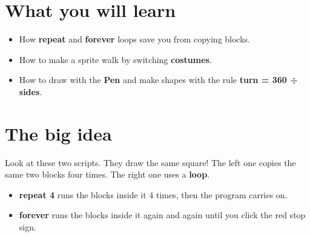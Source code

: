 
\section{What you will learn}
\begin{itemize}[leftmargin=1.2em,itemsep=1pt]
  \item How \textbf{repeat} and \textbf{forever} loops save you from copying blocks.
  \item How to make a sprite walk by switching \textbf{costumes}.
  \item How to draw with the \textbf{Pen} and make shapes with the rule \textbf{turn = 360 ÷ sides}.
\end{itemize}

\section{The big idea}
Look at these two scripts. They draw the same square! The left one copies the same two blocks four times. The right one uses a \textbf{loop}.

\begin{center}
\begin{scratch}[scale=0.75]
\end{scratch}
\hspace{1.5cm}{\Large =}\hspace{1.5cm}
\begin{scratch}[scale=0.75]
\end{scratch}
\end{center}

\begin{itemize}[leftmargin=1.2em,itemsep=1pt]
  \item \textbf{repeat 4} runs the blocks inside it 4 times, then the program carries on.
  \item \textbf{forever} runs the blocks inside it again and again until you click the red stop sign.
\end{itemize}

